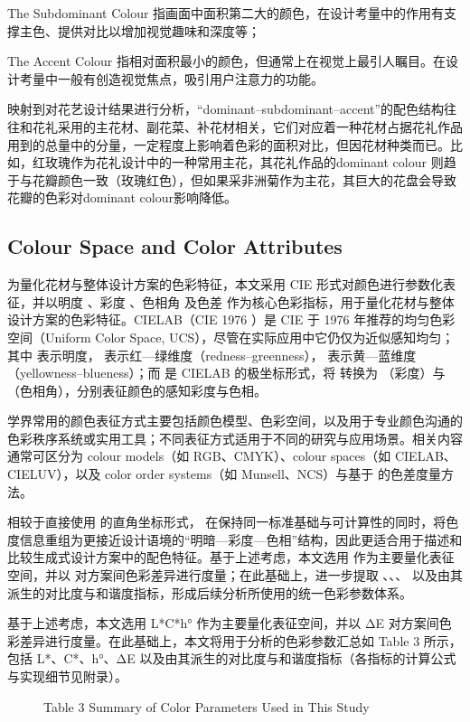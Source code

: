 The Subdominant Colour 指画面中面积第二大的颜色，在设计考量中的作用有支撑主色、提供对比以增加视觉趣味和深度等；

The Accent Colour 指相对面积最小的颜色，但通常上在视觉上最引人瞩目。在设计考量中一般有创造视觉焦点，吸引用户注意力的功能。

映射到对花艺设计结果进行分析，“dominant–subdominant–accent”的配色结构往往和花礼采用的主花材、副花菜、补花材相关，它们对应着一种花材占据花礼作品用到的总量中的分量，一定程度上影响着色彩的面积对比，但因花材种类而已。比如，红玫瑰作为花礼设计中的一种常用主花，其花礼作品的dominant colour 则趋于与花瓣颜色一致（玫瑰红色），但如果采非洲菊作为主花，其巨大的花盘会导致花瓣的色彩对dominant colour影响降低。

\subsection{Colour Space and Color Attributes}

为量化花材与整体设计方案的色彩特征，本文采用 CIE 形式对颜色进行参数化表征，并以明度 、彩度 、色相角 及色差 作为核心色彩指标，用于量化花材与整体设计方案的色彩特征。CIELAB（CIE 1976 ）是 CIE 于 1976 年推荐的均匀色彩空间（Uniform Color Space, UCS），尽管在实际应用中它仍仅为近似感知均匀；其中 表示明度， 表示红—绿维度（redness–greenness）， 表示黄—蓝维度（yellowness–blueness）；而 是 CIELAB 的极坐标形式，将 转换为 （彩度）与 （色相角），分别表征颜色的感知彩度与色相。

学界常用的颜色表征方式主要包括颜色模型、色彩空间，以及用于专业颜色沟通的色彩秩序系统或实用工具；不同表征方式适用于不同的研究与应用场景。相关内容通常可区分为 colour models（如 RGB、CMYK）、colour spaces（如 CIELAB、CIELUV），以及 color order systems（如 Munsell、NCS）与基于 的色差度量方法。

相较于直接使用 的直角坐标形式， 在保持同一标准基础与可计算性的同时，将色度信息重组为更接近设计语境的“明暗—彩度—色相”结构，因此更适合用于描述和比较生成式设计方案中的配色特征。基于上述考虑，本文选用 作为主要量化表征空间，并以 对方案间色彩差异进行度量；在此基础上，进一步提取 、、、 以及由其派生的对比度与和谐度指标，形成后续分析所使用的统一色彩参数体系。

基于上述考虑，本文选用 L*C*h° 作为主要量化表征空间，并以 ΔE 对方案间色彩差异进行度量。在此基础上，本文将用于分析的色彩参数汇总如 Table 3 所示，包括 L*、C*、h°、ΔE 以及由其派生的对比度与和谐度指标（各指标的计算公式与实现细节见附录）。

\begin{figure}[htbp]

  \centering



  \caption{Table 3 Summary of Color Parameters Used in This Study}

  \label{fig:table_3_summary_of_color_parameters_used}

\end{figure}

